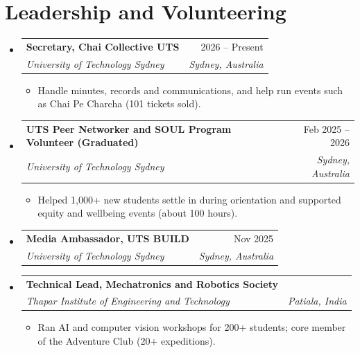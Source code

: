 \documentclass[letterpaper,11pt]{article}
\makeatletter
\newcommand{\resumeItem}[1]{\item\small{#1}}
\newcommand{\resumeSubheading}[4]{
  \vspace{-1pt}\item
    \begin{tabular*}{0.98\textwidth}[t]{l@{\extracolsep{\fill}}r}
      \textbf{#1} & #2 \\
      \textit{\small #3} & \textit{\small #4} \\
    \end{tabular*}\vspace{-6pt}
}
\newcommand{\resumeSubHeadingListStart}{\begin{itemize}[leftmargin=0.12in, label={}]}
\newcommand{\resumeSubHeadingListEnd}{\end{itemize}}
\newcommand{\resumeItemListStart}{\begin{itemize}}
\newcommand{\resumeItemListEnd}{\end{itemize}\vspace{-4pt}}
\makeatother
\begin{document}
\section{Leadership and Volunteering}
\resumeSubHeadingListStart
  \resumeSubheading
    {Secretary, Chai Collective UTS}{2026 -- Present}
    {University of Technology Sydney}{Sydney, Australia}
    \resumeItemListStart
      \resumeItem{Handle minutes, records and communications, and help run events such as Chai Pe Charcha (101 tickets sold).}
    \resumeItemListEnd
  \resumeSubheading
    {UTS Peer Networker and SOUL Program Volunteer (Graduated)}{Feb 2025 -- 2026}
    {University of Technology Sydney}{Sydney, Australia}
    \resumeItemListStart
      \resumeItem{Helped 1,000+ new students settle in during orientation and supported equity and wellbeing events (about 100 hours).}
    \resumeItemListEnd
  \resumeSubheading
    {Media Ambassador, UTS BUILD}{Nov 2025}
    {University of Technology Sydney}{Sydney, Australia}
  \resumeSubheading
    {Technical Lead, Mechatronics and Robotics Society}{}
    {Thapar Institute of Engineering and Technology}{Patiala, India}
    \resumeItemListStart
      \resumeItem{Ran AI and computer vision workshops for 200+ students; core member of the Adventure Club (20+ expeditions).}
    \resumeItemListEnd
\resumeSubHeadingListEnd
\end{document}
